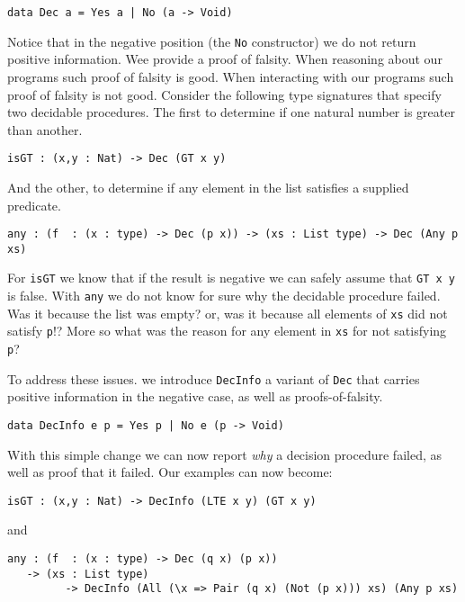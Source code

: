 \documentclass[%
draft,
a4paper,
UKenglish,
cleveref,
autoref,
thm-restate,
pdfa
]{oasics-v2021}
\begin{document}
\begin{verbatim}
data Dec a = Yes a | No (a -> Void)
\end{verbatim}

\noindent
Notice that in the negative position (the \texttt{No} constructor) we do not return positive information.
Wee provide a proof of falsity.
When reasoning about our programs such proof of falsity is good.
When interacting with our programs such proof of falsity is not good.
Consider the following type signatures that specify two decidable procedures.
The first to determine if one natural number is greater than another.

\begin{verbatim}
isGT : (x,y : Nat) -> Dec (GT x y)
\end{verbatim}

\noindent
And the other, to determine if any element in the list satisfies a supplied predicate.

\begin{verbatim}
any : (f  : (x : type) -> Dec (p x)) -> (xs : List type) -> Dec (Any p xs)
\end{verbatim}

For \texttt{isGT} we know that if the result is negative we can safely assume that \texttt{GT x y} is false.
With \texttt{any} we do not know for sure why the decidable procedure failed.
Was it because the list was empty?
or,
was it because all elements of \texttt{xs} did not satisfy \texttt{p}!?
More so what was the reason for any element in \texttt{xs} for not satisfying \texttt{p}?

To address these issues. we introduce \texttt{DecInfo} a variant of \texttt{Dec} that carries positive information in the negative case, as well as proofs-of-falsity.

\begin{verbatim}
data DecInfo e p = Yes p | No e (p -> Void)
\end{verbatim}

With this simple change we can now report \emph{why} a decision procedure failed, as well as proof that it failed.
Our examples can now become:

\begin{verbatim}
isGT : (x,y : Nat) -> DecInfo (LTE x y) (GT x y)
\end{verbatim}

\noindent
and

\begin{verbatim}
any : (f  : (x : type) -> Dec (q x) (p x))
   -> (xs : List type)
         -> DecInfo (All (\x => Pair (q x) (Not (p x))) xs) (Any p xs)
\end{verbatim}
\end{document}

